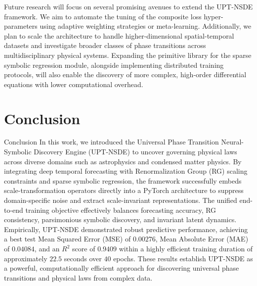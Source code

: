\documentclass[10pt,twocolumn]{article}
\begin{document}
Future research will focus on several promising avenues to extend the UPT-NSDE framework. We aim to automate the tuning of the composite loss hyper-parameters using adaptive weighting strategies or meta-learning. Additionally, we plan to scale the architecture to handle higher-dimensional spatial-temporal datasets and investigate broader classes of phase transitions across multidisciplinary physical systems. Expanding the primitive library for the sparse symbolic regression module, alongside implementing distributed training protocols, will also enable the discovery of more complex, high-order differential equations with lower computational overhead.

\section{Conclusion}
\begin{section}{Conclusion}
In this work, we introduced the Universal Phase Transition Neural-Symbolic Discovery Engine (UPT-NSDE) to uncover governing physical laws across diverse domains such as astrophysics and condensed matter physics. By integrating deep temporal forecasting with Renormalization Group (RG) scaling constraints and sparse symbolic regression, the framework successfully embeds scale-transformation operators directly into a PyTorch architecture to suppress domain-specific noise and extract scale-invariant representations. The unified end-to-end training objective effectively balances forecasting accuracy, RG consistency, parsimonious symbolic discovery, and invariant latent dynamics. Empirically, UPT-NSDE demonstrated robust predictive performance, achieving a best test Mean Squared Error (MSE) of $0.00276$, Mean Absolute Error (MAE) of $0.04084$, and an $R^2$ score of $0.9409$ within a highly efficient training duration of approximately $22.5$ seconds over $40$ epochs. These results establish UPT-NSDE as a powerful, computationally efficient approach for discovering universal phase transitions and physical laws from complex data.
\end{section}



\end{document}
